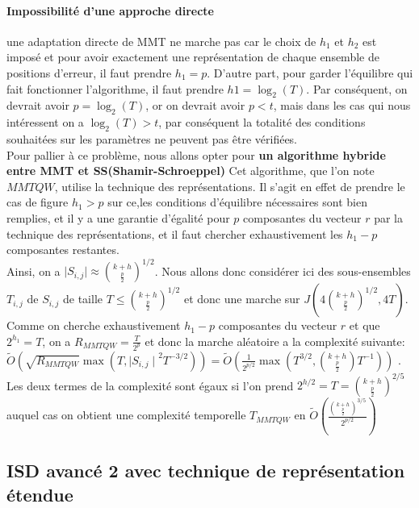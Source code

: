 \documentclass[12pt,openany]{report}
\begin{document}
\paragraph{Impossibilité d'une approche directe}\cite{Ghazal}  une adaptation directe de MMT ne marche pas car le choix de $ h_1$ et $ h_2$ est imposé et pour avoir  exactement une représentation de chaque ensemble de positions
d’erreur, il faut prendre $ h_1 = p$. D’autre part, pour garder l’équilibre qui
fait fonctionner l’algorithme, il faut prendre $h1 = \log_2(T)$. Par conséquent, on
devrait avoir $p = \log_2(T)$, or on devrait avoir $p < t$, mais dans les cas qui nous
intéressent on a $\log_2
(T) > t$, par conséquent la totalité des conditions souhaitées
sur les paramètres ne peuvent pas être vérifiées.\\ Pour pallier à ce problème, nous allons opter pour \textbf{un algorithme hybride entre MMT et SS(Shamir-Schroeppel)} Cet algorithme, que l’on note
$MMTQW$, utilise la technique des représentations. Il s’agit en effet de prendre
le cas de figure $h_1 > p$ sur ce,les conditions d’équilibre nécessaires sont bien
remplies, et il y a une garantie d’égalité pour $p$ composantes du vecteur $r$ par
la technique des représentations, et il faut chercher exhaustivement les $h_1-p$
composantes restantes.\\
Ainsi, on a $\mid S_{i,j} \mid \approx {{k+h}\choose{\frac{p}{2}}}^{1/2}$. Nous allons donc considérer ici des sous-ensembles $T_{i,j}  $ de $S_{i,j}  $ de taille $T\leq  {{k+h}\choose{\frac{p}{2}}}^{1/2} $ et donc une marche sur {\large $ \mathit{J}\left( 4 {{k+h}\choose{\frac{p}{2}}}^{1/2},4T \right) $}.\\
Comme on cherche exhaustivement $h_1-p $ composantes du vecteur $r$ et que $2^{h_1}=T   $, on a $ R_{MMTQW}=\frac{T}{2^p}   $ et donc la marche aléatoire a la complexité suivante:\\
{\large
$ \tilde{O}(\sqrt{R_{MMTQW}}\max\left(T,{\mid S_{i,j} \mid }^2 T^{-{3/2}}\right) )                               =\tilde{O}\left(\frac{1}{2^{p/2}}\max\left(T^{3/2},{{k+h}\choose{\frac{p}{2}}} T^{-1} \right)  \right) $
}.\\
Les deux termes de la complexité sont égaux si l’on prend {\large $ 2^{h/2}=T= {{k+h}\choose{\frac{p}{2}}}^{2/5}  $} auquel cas on obtient une complexité temporelle {\large $  T_{MMTQW}   $ en $ \tilde{O}\left( \frac{{{k+h}\choose{\frac{p}{2}}}^{3/5}}{2^{p/2}} \right)   $}
\subsection{ISD avancé 2 avec technique de représentation étendue}
\end{document}

